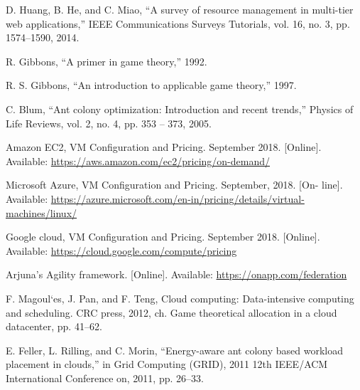 \documentclass[12pt,a4paper,twoside,openright]{report}
\begin{document}
\begin{thebibliography}{00}
	 D. Huang, B. He, and C. Miao, “A survey of resource management in
	multi-tier web applications,” IEEE Communications Surveys Tutorials,
	vol. 16, no. 3, pp. 1574–1590, 2014.

	 R. Gibbons, “A primer in game theory,” 1992.

	 R. S. Gibbons, “An introduction to applicable game theory,” 1997.

	 C. Blum, “Ant colony optimization: Introduction and recent trends,”
	Physics of Life Reviews, vol. 2, no. 4, pp. 353 – 373, 2005.

	 Amazon EC2, VM Configuration and Pricing. September 2018.
	[Online]. Available: \url{https://aws.amazon.com/ec2/pricing/on-demand/}

	 Microsoft Azure, VM Configuration and Pricing. September, 2018. [On-
	line]. Available: \url{https://azure.microsoft.com/en-in/pricing/details/virtual-
		machines/linux/}

	 Google cloud, VM Configuration and Pricing. September 2018.
	[Online]. Available: \url{https://cloud.google.com/compute/pricing}

	
	  Arjuna’s Agility framework. [Online]. Available:
	\href{https://onapp.com/federation}{https://onapp.com/federation}

	 F. Magoul`es, J. Pan, and F. Teng, Cloud computing: Data-intensive
	computing and scheduling. CRC press, 2012, ch. Game theoretical
	allocation in a cloud datacenter, pp. 41–62.
	
	E. Feller, L. Rilling, and C. Morin, “Energy-aware ant colony based
	workload placement in clouds,” in Grid Computing (GRID), 2011 12th
	IEEE/ACM International Conference on, 2011, pp. 26–33.
	
\end{thebibliography}
	
\end{document}
